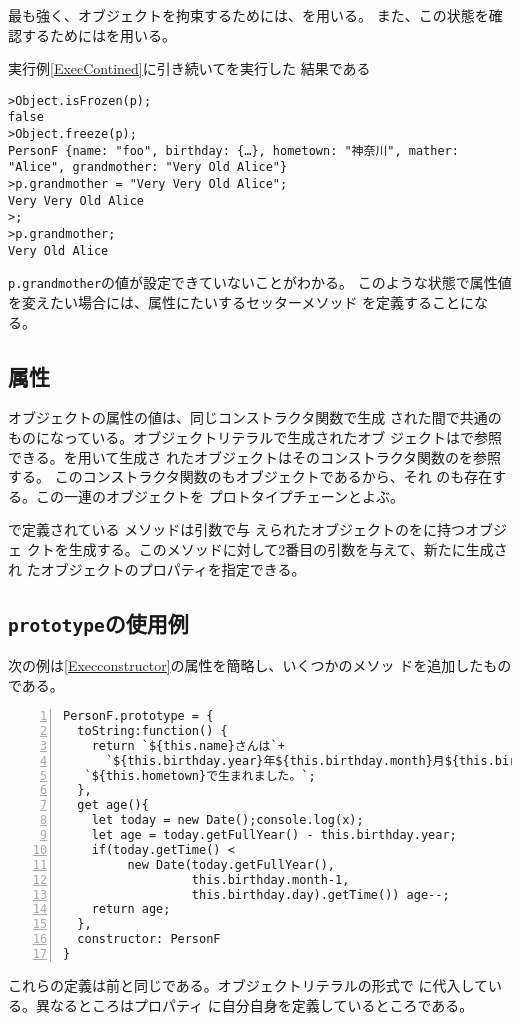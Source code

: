最も強く、オブジェクトを拘束するためには、を用いる。
また、この状態を確認するためにはを用いる。
  \begin{Exec}\upshape
   実行例\ref{ExecContined}に引き続いてを実行した
   結果である
 \end{Exec}
\begin{Verbatim}
>Object.isFrozen(p);
false
>Object.freeze(p);
PersonF {name: "foo", birthday: {…}, hometown: "神奈川", mather: "Alice", grandmother: "Very Old Alice"}
>p.grandmother = "Very Very Old Alice";
Very Very Old Alice
>;
>p.grandmother;
Very Old Alice
\end{Verbatim}
 \texttt{p.grandmother}の値が設定できていないことがわかる。
このような状態で属性値を変えたい場合には、属性にたいするセッターメソッド
を定義することになる。

 \iffalse
 なお、\texttt{Object.seal()}や \texttt{Object.freeze()}の影響は、渡され
 たオブジェクト自身の属性にしか影響を及ぼさない。継承元のオブジェクトに
 は影響を及ぼさない。
 \fi
 \subsection{\protect{}属性}
 オブジェクトの属性の値は、同じコンストラクタ関数で生成
 された間で共通のものになっている。オブジェクトリテラルで生成されたオブ
 ジェクトはで参照できる。を用いて生成さ
 れたオブジェクトはそのコンストラクタ関数のを参照する。
 このコンストラクタ関数のもオブジェクトであるから、それ
 のも存在する。この一連のオブジェクトを
 プロトタイプチェーンとよぶ。

 \JS で定義されている  メソッドは引数で与
 えられたオブジェクトのをに持つオブジェ
 クトを生成する。このメソッドに対して2番目の引数を与えて、新たに生成され
 たオブジェクトのプロパティを指定できる。
 \subsection{\protect\texttt{prototype}の使用例}
 \begin{Exec}\upshape\label{ExecConst2}
  次の例は\ref{Execconstructor}の属性を簡略し、いくつかのメソッ
 ドを追加したものである。
\begin{Verbatim}[numbers=left]
PersonF.prototype = {
  toString:function() {
    return `${this.name}さんは`+
      `${this.birthday.year}年${this.birthday.month}月${this.birthday.day}日に` +
   `${this.hometown}で生まれました。`;
  },
  get age(){
    let today = new Date();console.log(x);
    let age = today.getFullYear() - this.birthday.year;
    if(today.getTime() <
         new Date(today.getFullYear(),
                  this.birthday.month-1,
                  this.birthday.day).getTime()) age--;
    return age;
  },
  constructor: PersonF
}
\end{Verbatim}
 \end{Exec}
これらの定義は前と同じである。オブジェクトリテラルの形式で
に代入している。異なるところはプロパティ
に自分自身を定義しているところである。

